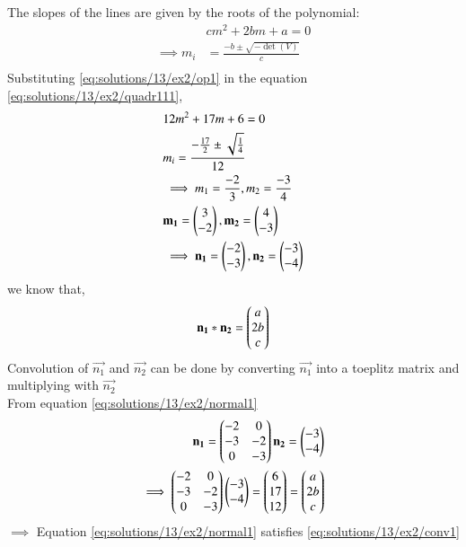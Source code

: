 The slopes of the lines are given by the roots of the polynomial:
\begin{align}
    &cm^2+2bm+a=0 \label{eq:solutions/13/ex2/quadr111}\\
    \implies m_i&=\frac{-b\pm{\sqrt{-\det(V)}}}{c}\\
\end{align}
Substituting \eqref{eq:solutions/13/ex2/op1} in the equation \eqref{eq:solutions/13/ex2/quadr111},
\begin{align}
    &12m^2+17m+6=0 \label{eq:solutions/13/ex2/quadr1}\\
    &m_i=\frac{-\frac{17}{2}\pm{\sqrt{\frac{1}{4}}}}{12}\\
    &\implies m_1 = \frac{-2}{3} , m_2 = \frac{-3}{4}\\
    & \mathbf{m_1}=\begin{pmatrix}3\\ -2\end{pmatrix}, \mathbf{m_2}=\begin{pmatrix}4\\ -3\end{pmatrix}\\
    &\implies \mathbf{n_1}=\begin{pmatrix}-2\\ -3\end{pmatrix}, \mathbf{n_2}=\begin{pmatrix}-3\\ -4\end{pmatrix} \label{eq:solutions/13/ex2/normal1}
\end{align}
we know that, 
\begin{align}
\mathbf{n_1}\ast \mathbf{n_2} = \begin{pmatrix}a\\2b\\c\end{pmatrix} \label{eq:solutions/13/ex2/conv1}
\end{align}
Convolution of $\vec{n_1}$ and $\vec{n_2}$ can be done by converting $\vec{n_1}$ into a toeplitz matrix and multiplying with $\vec{n_2}$\\
From equation \eqref{eq:solutions/13/ex2/normal1}
\begin{align}
    \mathbf{n_1}=\begin{pmatrix}-2&0\\-3&-2\\0&-3\end{pmatrix}
    \mathbf{n_2}=\begin{pmatrix}-3\\ -4\end{pmatrix}\label{eq:solutions/13/ex2/conv2}\\
\implies \begin{pmatrix}-2&0\\-3&-2\\0&-3\end{pmatrix}\begin{pmatrix}-3\\ -4\end{pmatrix} = \begin{pmatrix}6\\17\\12\end{pmatrix} = \begin{pmatrix}a\\2b\\c\end{pmatrix}\label{eq:solutions/13/ex2/conv3}
\end{align}
$\implies$ Equation \eqref{eq:solutions/13/ex2/normal1} satisfies \eqref{eq:solutions/13/ex2/conv1}\\

